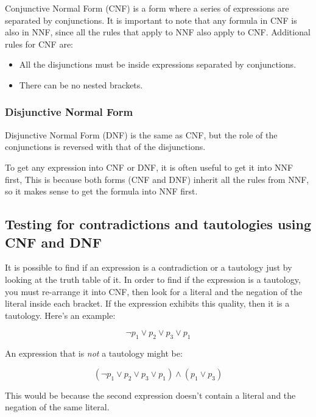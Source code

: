 Conjunctive Normal Form (CNF) is a form where a series of expressions are
separated by conjunctions. It is important to note that any formula in CNF is
also in NNF, since all the rules that apply to NNF also apply to CNF. Additional
rules for CNF are:

\begin{itemize}
	\item All the disjunctions must be inside expressions separated by
	conjunctions.
	\item There can be no nested brackets.
\end{itemize}

\subsubsection{Disjunctive Normal Form}

Disjunctive Normal Form (DNF) is the same as CNF, but the role of the
conjunctions is reversed with that of the disjunctions.

To get any expression into CNF or DNF, it is often useful to get it into NNF
first, This is because both forms (CNF and DNF) inherit all the rules from NNF,
so it makes sense to get the formula into NNF first.

\subsection{Testing for contradictions and tautologies using CNF and DNF}

It is possible to find if an expression is a contradiction or a tautology just
by looking at the truth table of it. In order to find if the expression is a
tautology, you must re-arrange it into CNF, then look for a literal and the
negation of the literal inside each bracket. If the expression exhibits this
quality, then it is a tautology. Here's an example:

\begin{dmath}
	{\neg p_1 \vee p_2 \vee p_3 \vee p_1}
\end{dmath}

An expression that is {\it not} a tautology might be:

\begin{dmath}
	{(\neg p_1 \vee p_2 \vee p_3 \vee p_1) \wedge (p_1 \vee p_3)}
\end{dmath}

This would be because the second expression doesn't contain a literal and the
negation of the same literal.

